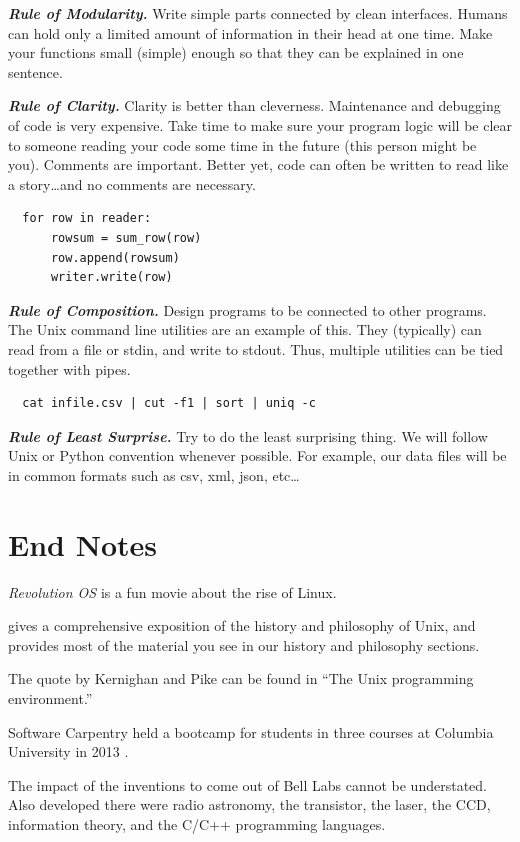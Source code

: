 \textit{\textbf{Rule of Modularity.}}
Write simple parts connected by clean interfaces.  Humans can hold only a limited amount of information in their head at one time.  Make your functions small (simple) enough so that they can be explained in one sentence.

\textit{\textbf{Rule of Clarity.}}
Clarity is better than cleverness.  Maintenance and debugging of code is very expensive.  Take time to make sure your program logic will be clear to someone reading your code some time in the future (this person might be you).  Comments are important.  Better yet, code can often be written to read like a story\dots and no comments are necessary.
\begin{verbatim}
  for row in reader:
      rowsum = sum_row(row)
      row.append(rowsum)
      writer.write(row)
\end{verbatim}

\textit{\textbf{Rule of Composition.}}
Design programs to be connected to other programs.  The Unix command line utilities are an example of this.  They (typically) can read from a file or stdin, and write to stdout.  Thus, multiple utilities can be tied together with pipes.
\begin{verbatim}
  cat infile.csv | cut -f1 | sort | uniq -c
\end{verbatim}


\textit{\textbf{Rule of Least Surprise.}}
Try to do the least surprising thing.  We will follow Unix or Python convention whenever possible.  For example, our data files will be in common formats such as csv, xml, json, etc\dots


\section{End Notes}
\emph{Revolution OS} is a fun movie about the rise of Linux.

\cite{RaymondUnix} gives a comprehensive exposition of the history and philosophy of Unix, and provides most of the material you see in our history and philosophy sections.  

The quote by Kernighan and Pike can be found in ``The Unix programming environment.''\cite{UnixProgrammingEnvironment}

Software Carpentry held a bootcamp for students in three courses at Columbia University in 2013 \cite{SWC-NYC2013}.

The impact of the inventions to come out of Bell Labs cannot be understated.  Also developed there were radio astronomy, the transistor, the laser, the CCD, information theory, and the C/C++ programming languages.\cite{BellLabsWikipedia}
